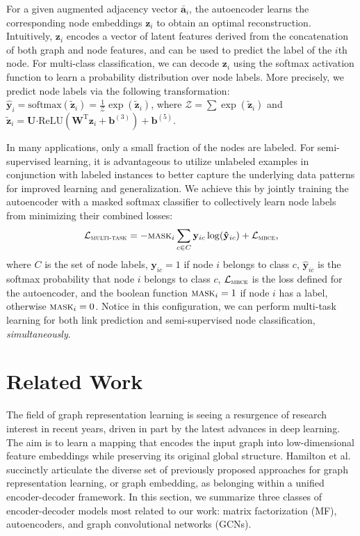 \documentclass[letterpaper, conference]{IEEEtran}
\begin{document}
For a given augmented adjacency vector $\mathbf{\bar{a}}_i$, the autoencoder learns the corresponding node embeddings $\mathbf{z}_i$ to obtain an optimal reconstruction. Intuitively, $\mathbf{z}_i$ encodes a vector of latent features derived from the concatenation of both graph and node features, and can be used to predict the label of the $i$th node. For multi-class classification, we can decode $\mathbf{z}_i$ using the softmax activation function to learn a probability distribution over node labels. More precisely, we predict node labels via the following transformation: $\mathbf{\hat{y}}_i = \text{softmax}(\mathbf{\tilde{z}}_i) = \frac{1}{\mathcal{Z}} \exp(\mathbf{\tilde{z}}_i)$, where $\mathcal{Z} = \sum \exp(\mathbf{\tilde{z}}_i)$ and $\mathbf{\tilde{z}}_i = \mathbf{U} \boldsymbol{\cdot} \text{ReLU}\left(\mathbf{W}^\text{T} \mathbf{z}_i + \mathbf{b}^{(3)}\right) + \mathbf{b}^{(5)}$.

In many applications, only a small fraction of the nodes are labeled. For semi-supervised learning, it is advantageous to utilize unlabeled examples in conjunction with labeled instances to better capture the underlying data patterns for improved learning and generalization. We achieve this by jointly training the autoencoder with a masked softmax classifier to collectively learn node labels from minimizing their combined losses:
\begin{equation*}
\mathcal{L}_{\textsc{multi-task}} = - \textsc{mask}_i \sum_{c \in C}\mathbf{y}_{ic} \log (\mathbf{\hat{y}}_{ic}) + \mathcal{L}_{\textsc{mbce}},
\end{equation*}
where $C$ is the set of node labels, $\mathbf{y}_{ic} = 1$ if node $i$ belongs to class $c$, $\mathbf{\hat{y}}_{ic}$ is the softmax probability that node $i$ belongs to class $c$, $\mathcal{L}_{\textsc{mbce}}$ is the loss defined for the autoencoder, and the boolean function $\textsc{mask}_i = 1$ if node $i$ has a label, otherwise $\textsc{mask}_i = 0$. Notice in this configuration, we can perform multi-task learning for both link prediction and semi-supervised node classification, \emph{simultaneously}.

\section{Related Work}

The field of graph representation learning is seeing a resurgence of research interest in recent years, driven in part by the latest advances in deep learning. The aim is to learn a mapping that encodes the input graph into low-dimensional feature embeddings while preserving its original global structure. Hamilton et al. \cite{Hamilton:2017} succinctly articulate the diverse set of previously proposed approaches for graph representation learning, or graph embedding, as belonging within a unified encoder-decoder framework. In this section, we summarize three classes of encoder-decoder models most related to our work: matrix factorization (MF), autoencoders, and graph convolutional networks (GCNs).
\end{document}
